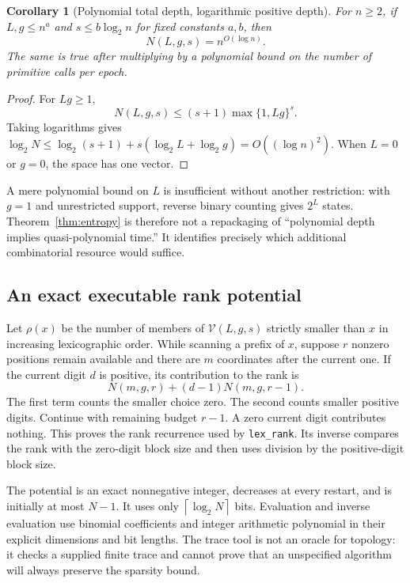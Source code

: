 \documentclass[11pt,letterpaper]{article}
\newtheorem{corollary}[theorem]{Corollary}
\theoremstyle{definition}
\theoremstyle{remark}
\newcommand{\ceil}[1]{\left\lceil #1\right\rceil}
\begin{document}
\begin{corollary}[Polynomial total depth, logarithmic positive depth]
\label{cor:sparseqp}
For $n\geq2$, if $L,g\leq n^a$ and $s\leq b\log_2 n$ for fixed constants
$a,b$, then
\[
 N(L,g,s)=n^{O(\log n)}.
\]
The same is true after multiplying by a polynomial bound on the number of
primitive calls per epoch.
\end{corollary}
\begin{proof}
For $Lg\geq1$,
\[
 N(L,g,s)\leq(s+1)\max\{1,Lg\}^{s}.
\]
Taking logarithms gives
$\log_2 N\leq\log_2(s+1)+s(\log_2L+\log_2g)=O((\log n)^2)$.
When $L=0$ or $g=0$, the space has one vector.
\end{proof}

A mere polynomial bound on $L$ is insufficient without another restriction:
with $g=1$ and unrestricted support, reverse binary counting gives $2^L$
states. Theorem~\ref{thm:entropy} is therefore not a repackaging of
``polynomial depth implies quasi-polynomial time.'' It identifies precisely
which additional combinatorial resource would suffice.

\subsection{An exact executable rank potential}
Let $\rho(x)$ be the number of members of $\mathcal V(L,g,s)$ strictly
smaller than $x$ in increasing lexicographic order. While scanning a prefix
of $x$, suppose $r$ nonzero positions remain available and there are $m$
coordinates after the current one. If the current digit $d$ is positive,
its contribution to the rank is
\begin{equation}
 N(m,g,r)+(d-1)N(m,g,r-1).
 \label{eq:rank}
\end{equation}
The first term counts the smaller choice zero. The second counts smaller
positive digits. Continue with remaining budget $r-1$. A zero current digit
contributes nothing. This proves the rank recurrence used by
\texttt{lex\_rank}. Its inverse compares the rank with the zero-digit block
size and then uses division by the positive-digit block size.

The potential is an exact nonnegative integer, decreases at every restart,
and is initially at most $N-1$. It uses only $\ceil{\log_2N}$ bits.
Evaluation and inverse evaluation use binomial coefficients and integer
arithmetic polynomial in their explicit dimensions and bit lengths. The
trace tool is not an oracle for topology: it checks a supplied finite trace
and cannot prove that an unspecified algorithm will always preserve the
sparsity bound.
\end{document}
